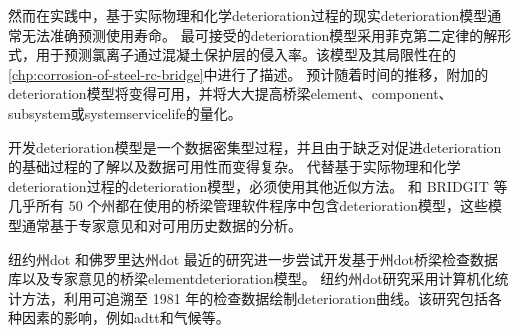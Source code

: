 然而在实践中，基于实际物理和化学\gls*{deterioration}过程的现实\acrlong*{deterioration}模型通常无法准确预测使用寿命。 最可接受的\gls*{deterioration}模型采用菲克第二定律的解形式，用于预测氯离子通过混凝土保护层的侵入率。该模型及其局限性在的\cref{chp:corrosion-of-steel-rc-bridge}中进行了描述。 预计随着时间的推移，附加的\gls*{deterioration}模型将变得可用，并将大大提高桥梁\gls*{element}、\gls*{component}、\gls*{subsystem}或\gls*{system}\gls*{servicelife}的量化。

开发\gls*{deterioration}模型是一个数据密集型过程，并且由于缺乏对促进\gls*{deterioration}的基础过程的了解以及数据可用性而变得复杂。 代替基于实际物理和化学\gls*{deterioration}过程的\gls*{deterioration}模型，必须使用其他近似方法。 \pontis 和 BRIDGIT 等几乎所有 50 个州都在使用的桥梁管理软件程序中包含\gls*{deterioration}模型，这些模型通常基于专家意见和对可用历史数据的分析。

纽约州\acrlong*{dot} \cite{agrawal2009b} 和佛罗里达州\acrlong*{dot} \cite{sobanjo2011d} 最近的研究进一步尝试开发基于州\acrlong*{dot}桥梁检查数据库以及专家意见的桥梁\gls*{element}\gls*{deterioration}模型。 纽约州\acrlong*{dot}研究采用计算机化统计方法，利用可追溯至 1981 年的检查数据绘制\gls*{deterioration}曲线。该研究包括各种因素的影响，例如\acrfull*{adtt}和气候等。

